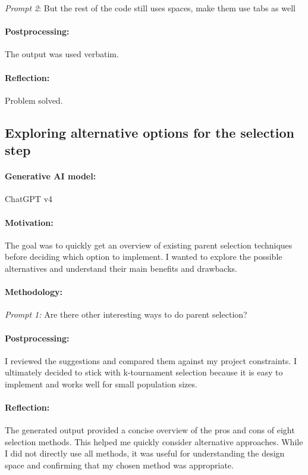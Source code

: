 \documentclass[a4paper,10pt]{article} %
\begin{document}
\noindent
\textit{Prompt 2}: But the rest of the code still uses spaces, make them use tabs as well

\paragraph{Postprocessing:} 
The output was used verbatim.

\paragraph{Reflection:} 
Problem solved.


\subsection{Exploring alternative options for the selection step} 
\paragraph{Generative AI model:} ChatGPT v4
\paragraph{Motivation:}
The goal was to quickly get an overview of existing parent selection techniques before deciding which option to implement. I wanted to explore the possible alternatives and understand their main benefits and drawbacks.

\paragraph{Methodology:} 
\textit{Prompt 1:}
Are there other interesting ways to do parent selection?
\paragraph{Postprocessing:} I reviewed the suggestions and compared them against my project constraints. I ultimately decided to stick with k-tournament selection because it is easy to implement and works well for small population sizes.

\paragraph{Reflection:} 
The generated output provided a concise overview of the pros and cons of eight selection methods. This helped me quickly consider alternative approaches. While I did not directly use all methods, it was useful for understanding the design space and confirming that my chosen method was appropriate.
\end{document}
